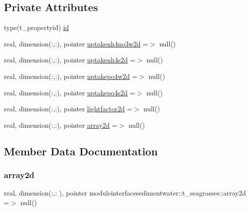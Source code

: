 \subsection*{Private Attributes}
\begin{DoxyCompactItemize}
\item 
type(t\+\_\+propertyid) \mbox{\hyperlink{structmoduleinterfacesedimentwater_1_1t__seagrasses_a11fa5a6bcc26452c4904ed437e65d221}{id}}
\item 
real, dimension(\+:,\+:), pointer \mbox{\hyperlink{structmoduleinterfacesedimentwater_1_1t__seagrasses_a2cae36888a4f9b2d5b6c1f97d0e23b6a}{uptakenh4no3w2d}} =$>$ null()
\item 
real, dimension(\+:,\+:), pointer \mbox{\hyperlink{structmoduleinterfacesedimentwater_1_1t__seagrasses_ae00acd7bc86aaf457c1662ae3a131020}{uptakenh4s2d}} =$>$ null()
\item 
real, dimension(\+:,\+:), pointer \mbox{\hyperlink{structmoduleinterfacesedimentwater_1_1t__seagrasses_ab460f7600590fed4775fcc475180e950}{uptakepo4w2d}} =$>$ null()
\item 
real, dimension(\+:,\+:), pointer \mbox{\hyperlink{structmoduleinterfacesedimentwater_1_1t__seagrasses_ab9f95c80a09ba82d622fffe76b6db7aa}{uptakepo4s2d}} =$>$ null()
\item 
real, dimension(\+:,\+:), pointer \mbox{\hyperlink{structmoduleinterfacesedimentwater_1_1t__seagrasses_ac7a069aac62569c80c5087c8dfc3dad3}{lightfactor2d}} =$>$ null()
\item 
real, dimension(\+:,\+:), pointer \mbox{\hyperlink{structmoduleinterfacesedimentwater_1_1t__seagrasses_a5dbbfc54b4226794c0b6955a79e11b51}{array2d}} =$>$ null()
\end{DoxyCompactItemize}


\subsection{Member Data Documentation}
\mbox{\label{structmoduleinterfacesedimentwater_1_1t__seagrasses_a5dbbfc54b4226794c0b6955a79e11b51}} 
\subsubsection{\texorpdfstring{array2d}{array2d}}
{\footnotesize\ttfamily real, dimension(\+:,\+:  ), pointer moduleinterfacesedimentwater\+::t\+\_\+seagrasses\+::array2d =$>$ null()\hspace{0.3cm}{\ttfamily [private]}}


